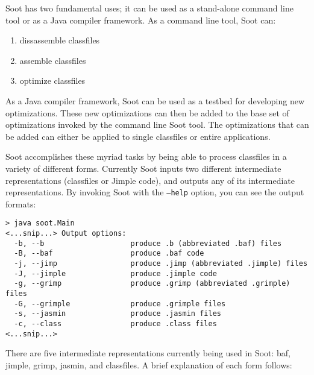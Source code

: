 \documentclass{article}
\begin{document}
Soot has two fundamental uses; it can be used as a stand-alone command
line tool or as a Java compiler framework.  As a command line tool,
Soot can:
\begin{enumerate}
\item dissassemble classfiles
\item assemble classfiles
\item optimize classfiles
\end{enumerate}

As a Java compiler framework, Soot can be used as a testbed for
developing new optimizations.  These new optimizations can then be
added to the base set of optimizations invoked by the command line
Soot tool.  The optimizations that can be added can either be applied
to single classfiles or entire applications.

Soot accomplishes these myriad tasks by being able to process
classfiles in a variety of different forms.  Currently Soot inputs two
different intermediate representations (classfiles or Jimple code),
and outputs any of its intermediate representations.  By invoking Soot with
the \texttt{--help} option,
you can see the output formats:

\begin{verbatim}
> java soot.Main
<...snip...> Output options:
  -b, --b                    produce .b (abbreviated .baf) files
  -B, --baf                  produce .baf code
  -j, --jimp                 produce .jimp (abbreviated .jimple) files
  -J, --jimple               produce .jimple code
  -g, --grimp                produce .grimp (abbreviated .grimple) files
  -G, --grimple              produce .grimple files
  -s, --jasmin               produce .jasmin files
  -c, --class                produce .class files
<...snip...>
\end{verbatim}

There are five intermediate representations currently being used in Soot: baf,
jimple, grimp, jasmin, and classfiles.  A brief explanation of each form
follows:
\end{document}
